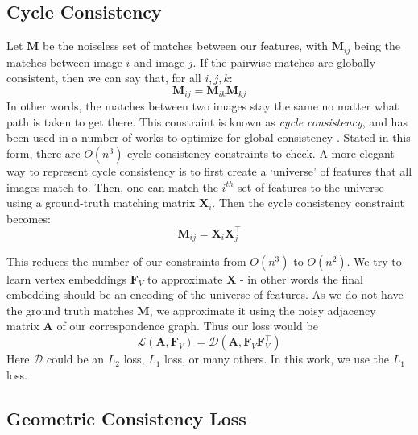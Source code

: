 \documentclass[10pt,twocolumn,letterpaper]{article}
\newcommand{\mat}[1]{\mathbf{#1}}
\begin{document}
\subsection{Cycle Consistency}

Let $\mat{M}$ be the noiseless set of matches between our features, with $\mat{M}_{ij}$ being the matches between image $i$ and image $j$.
If the pairwise matches are globally consistent, then we can say that, for all $i, j, k$:
\begin{equation}
\mat{M}_{ij} = \mat{M}_{ik} \mat{M}_{kj}
\label{eq:cycconsist1}
\end{equation}
In other words, the matches between two images stay the same no matter what path is taken to get there. 
This constraint is known as \textit{cycle consistency}, and has been used in a number of works to optimize for global consistency \cite{zhou2015multi, wang2017multi, leonardos2016distributed}.
Stated in this form, there are $O(n^3)$ cycle consistency constraints to check.
A more elegant way to represent cycle consistency is to first create a `universe' of features that all images match to.
Then, one can match the $i^{th}$ set of features to the universe using a ground-truth matching matrix $\mat{X}_i$.
Then the cycle consistency constraint becomes:
\begin{equation}
\mat{M}_{ij} = \mat{X}_{i}\mat{X}_{j}^\top
\label{eq:cycconsist2}
\end{equation}

This reduces the number of our constraints from $O(n^3)$ to $O(n^2)$.
We try to learn vertex embeddings $\mat{F}_V$ to approximate $\mat{X}$ - in other words the final embedding should be an encoding of the universe of features.
As we do not have the ground truth matches $\mat{M}$, we approximate it using the noisy adjacency matrix $\mat{A}$ of our correspondence graph. Thus our loss would be 
\begin{equation}
\mathcal{L}(\mat{A}, \mat{F}_V) = \mathcal{D}(\mat{A}, \mat{F}_V \mat{F}_V^\top)
\end{equation}
Here $\mathcal{D}$ could be an $L_2$ loss, $L_1$ loss, or many others. In this work, we use the $L_1$ loss. 

\subsection{Geometric Consistency Loss}
\end{document}
